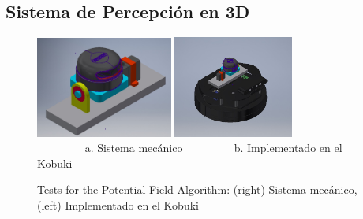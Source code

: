 \subsection{Sistema de Percepci\'on en 3D}
\begin{figure}%
  \centering \footnotesize
  \includegraphics[width=0.40\textwidth]{images/lidar_3D.jpeg}
  \includegraphics[width=0.35\textwidth]{images/kbki_lidar3D.jpeg}
  \\ $\qquad\qquad$ a. Sistema mecánico $\qquad\qquad$  b. Implementado en el Kobuki
  \captionsetup{font=footnotesize}
  \caption{Tests for the Potential Field Algorithm: (right) Sistema mecánico, (left) Implementado en el Kobuki} 
  \label{f:apf}
\end{figure}

